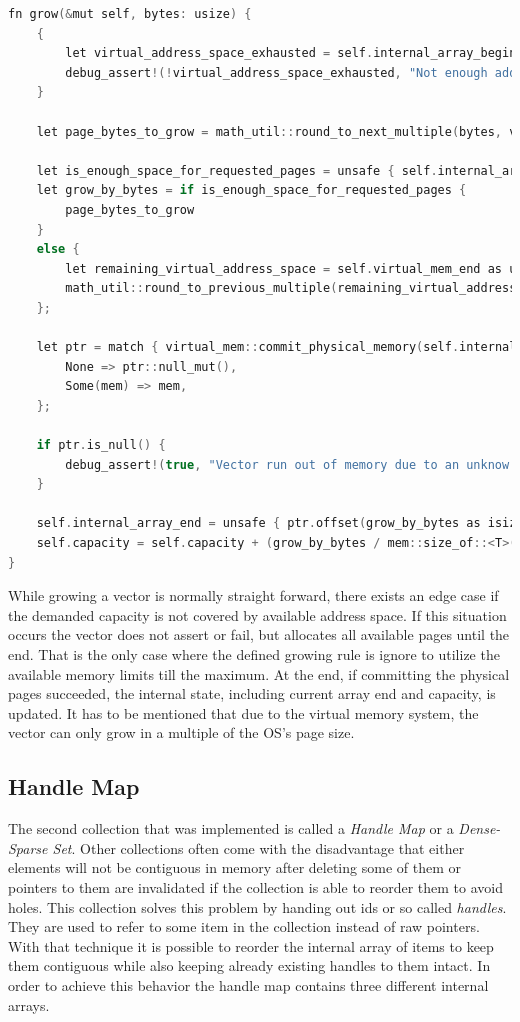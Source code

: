 \begin{lstlisting}[caption={Growth function of the Spark vector in Rust.}, label={lst:vector_growth}, language={C++}]
fn grow(&mut self, bytes: usize) {
	{
		let virtual_address_space_exhausted = self.internal_array_begin.as_ptr() as *mut u8 == self.virtual_mem_end;
		debug_assert!(!virtual_address_space_exhausted, "Not enough address space to grow further");
	}
	
	let page_bytes_to_grow = math_util::round_to_next_multiple(bytes, virtual_mem::get_page_size());
	
	let is_enough_space_for_requested_pages = unsafe { self.internal_array_end.offset(page_bytes_to_grow as isize) <= self.virtual_mem_end };
	let grow_by_bytes = if is_enough_space_for_requested_pages {
		page_bytes_to_grow
	}
	else {
		let remaining_virtual_address_space = self.virtual_mem_end as usize - self.internal_array_end as usize;
		math_util::round_to_previous_multiple(remaining_virtual_address_space, virtual_mem::get_page_size())
	};
	
	let ptr = match { virtual_mem::commit_physical_memory(self.internal_array_end, grow_by_bytes) } {
		None => ptr::null_mut(),
		Some(mem) => mem,
	};
	
	if ptr.is_null() {
		debug_assert!(true, "Vector run out of memory due to an unknow error");
	}
	
	self.internal_array_end = unsafe { ptr.offset(grow_by_bytes as isize) };
	self.capacity = self.capacity + (grow_by_bytes / mem::size_of::<T>());
}
\end{lstlisting}

\noindent
While growing a vector is normally straight forward, there exists an edge case if the demanded capacity is not covered by available address space. If this situation occurs the vector does not assert or fail, but allocates all available pages until the end. That is the only case where the defined growing rule is ignore to utilize the available memory limits till the maximum. At the end, if committing the physical pages succeeded, the internal state, including current array end and capacity, is updated. It has to be mentioned that due to the virtual memory system, the vector can only grow in a multiple of the \ac{OS}'s page size.

\subsection{Handle Map} \label{handle_map_impl}

The second collection that was implemented is called a \textit{Handle Map} or a \textit{Dense-Sparse Set}. Other collections often come with the disadvantage that either elements will not be contiguous in memory after deleting some of them or pointers to them are invalidated if the collection is able to reorder them to avoid holes. This collection solves this problem by handing out ids or so called \textit{handles}. They are used to refer to some item in the collection instead of raw pointers. With that technique it is possible to reorder the internal array of items to keep them contiguous while also keeping already existing handles to them intact. In order to achieve this behavior the handle map contains three different internal arrays. 

